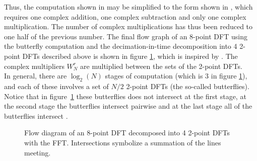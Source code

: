 Thus, the computation shown in \cite{figure 8, DTSP} may be simplified to the form shown in \cite{figure 10, DTSP}, which requires one complex addition, one complex subtraction and only one complex multiplication. The number of complex multiplications has thus been reduced to one half of the previous number. The final flow graph of an 8-point DFT using the butterfly computation and the decimation-in-time decomposition into 4 2-point DFTs described above is shown in figure \ref{fig:fft_flow}, which is inspired by \cite{figure 11, DTSP}. The complex multipliers $W_N^r$ are multiplied between the sets of the 2-point DFTs.
\\
In general, there are $\log_2(N)$ stages of computation (which is 3 in figure \ref{fig:fft_flow}), and each of these involves a set of $N/2$ 2-point DFTs (the so-called butterflies). Notice that in figure~\ref{fig:fft_flow} these butterflies does not intersect at the first stage, at the second stage the butterflies intersect pairwise and at the last stage all of the butterflies intersect .
\begin{figure}[H]
\centering
{}
\caption{Flow diagram of an 8-point DFT decomposed into 4 2-point DFTs with the FFT. Intersections symbolize a summation of the lines meeting.}
\label{fig:fft_flow}
\end{figure}


















